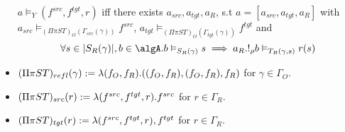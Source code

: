\documentclass[12pt,a4paper]{article}
\def\src{_{src}}\alwaysmath{src}
\def\rfl{_{refl}}\alwaysmath{rfl}
\def\tgt{_{tgt}}\alwaysmath{tgt}
\renewcommand{\O}{_{O}}\alwaysmath{O}
\def\R{_{R}}\alwaysmath{R}
\begin{document}
\begin{itemize}
    \subitem $a \vDash_Y (f^{src}, f^{tgt}, r)$ iff there exists $a\src, a\tgt, a\R$, s.t $a = [a\src, a\tgt, a\R]$ with $a\src \vDash_{(\Pi\pi S T)\O(\Gamma\src(\gamma))} f^{src}$, $a\tgt \vDash_{(\Pi\pi S T)\O(\Gamma\tgt(\gamma))} f^{tgt}$ and
    $$\forall s \in \carr{S\R(\gamma)}, b \in \algA. b \vDash_{S\R(\gamma)} s \implies a\R . !_\rho b \vDash_{T\R(\gamma,s)} r(s)$$
     

    \item $(\Pi \pi S T)\rfl(\gamma) \define \lambda (f\O, f\R). ((f\O, f\R), (f\O, f\R), f\R) $ for $\gamma \in \Gamma\O$.
    
    \item $(\Pi \pi S T)\src(r) \define \lambda (f^{src}, f^{tgt}, r). f^{src}$ for $r \in \Gamma\R$.
    
    \item $(\Pi \pi S T)\tgt(r) \define \lambda (f^{src}, f^{tgt}, r), f^{tgt}$ for $r \in \Gamma\R$.
\end{itemize}
\end{document}
